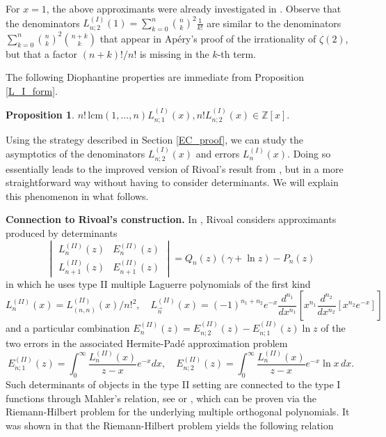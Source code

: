 \documentclass[a4paper,12pt,oneside]{article}
\theoremstyle{definition}
\newtheorem{prop}[defi]{Proposition}
\newcommand{\Z}{\mathbb{Z}}
\begin{document}
For $x=1$, the above approximants were already investigated in \cite[Theorem 1.1 ($a=3$)]{PilehroodEC}. Observe that the denominators $L_{n;2}^{(I)}(1) = \sum_{k=0}^{n} \binom{n}{k}^2 \frac{1}{k!}$ are similar to the denominators $ \sum_{k=0}^{n} \binom{n}{k}^2 \binom{n+k}{k}$ that appear in Apéry's proof \cite{Apery} of the irrationality of $\zeta(2)$, but that a factor $(n+k)!/n!$ is missing in the $k$-th term.
\medbreak

The following Diophantine properties are immediate from Proposition \ref{L_I_form}.

\begin{prop}
    $ n! \, \text{lcm}(1,\dots,n) L_{n;1}^{(I)}(x), n! L_{n;2}^{(I)}(x) \in\Z[x]. $
\end{prop}

Using the strategy described in Section \ref{EC_proof}, we can study the asymptotics of the denominators $L_{n;2}^{(I)}(x)$ and errors $L_{n}^{(I)}(x)$. Doing so essentially leads to the improved version of Rivoal's result from \cite{Pilehrood}, but in a more straightforward way without having to consider determinants. We will explain this phenomenon in what follows.
\medbreak

\textbf{Connection to Rivoal's construction.} In \cite{Riv}, Rivoal considers approximants produced by determinants 
$$\begin{vmatrix} L_{n}^{(II)}(z) & E_{n}^{(II)}(z) \\ L_{n+1}^{(II)}(z) & E_{n+1}^{(II)}(z) \end{vmatrix} = Q_n(z) (\gamma + \ln z) - P_n(z) $$
in which he uses type II multiple Laguerre polynomials of the first kind
    $$ L_{n}^{(II)}(x) = L_{(n,n)}^{(II)}(x) / n!^2 , \quad L_{\vec{n}}^{(II)}(x) = (-1)^{n_1+n_2} e^{-x} \frac{d^{n_1}}{dx^{n_1}}[x^{n_1} \frac{d^{n_2}}{dx^{n_2}}[x^{n_2} e^{-x} ]]$$
and a particular combination $E_{n}^{(II)}(z) = E_{n;2}^{(II)}(z) - E_{n;1}^{(II)}(z) \ln z$ of the two errors in the associated Hermite-Padé approximation problem
    $$E_{n;1}^{(II)}(z) = \int_0^\infty \frac{L_n^{(II)}(x)}{z-x} e^{-x} dx,\quad E_{n;2}^{(II)}(z) = \int_0^\infty \frac{L_n^{(II)}(x)}{z-x} e^{-x} \ln x \, dx .$$
Such determinants of objects in the type II setting are connected to the type I functions through Mahler's relation, see \cite[Theorem 23.8.3]{Ismail} or \cite[Section 4]{G-K-VA}, which can be proven via the Riemann-Hilbert problem for the underlying multiple orthogonal polynomials. It was shown in \cite[Theorem 4.1]{G-K-VA} that the Riemann-Hilbert problem yields the following relation
\end{document}
